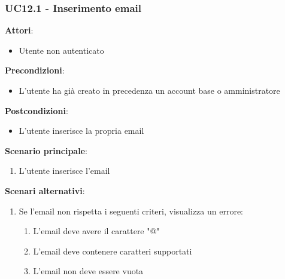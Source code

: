 \subsubsection{UC12.1 - Inserimento email} \label{usecase:12_1}
\textbf{Attori}:
\begin{itemize}
    \item Utente non autenticato
\end{itemize}
\textbf{Precondizioni}:
\begin{itemize}
    \item L'utente ha già creato in precedenza un account base o amministratore
\end{itemize}
\textbf{Postcondizioni}:
\begin{itemize}
    \item L'utente inserisce la propria email
\end{itemize}
\textbf{Scenario principale}:
\begin{enumerate}
    \item L'utente inserisce l'email
\end{enumerate}
\textbf{Scenari alternativi}:
\begin{enumerate}
    \item Se l'email non rispetta i seguenti criteri, visualizza un errore:
    \begin{enumerate}
        \item L'email deve avere il carattere "@"
        \item L'email deve contenere caratteri supportati
        \item L'email non deve essere vuota
    \end{enumerate}
\end{enumerate}